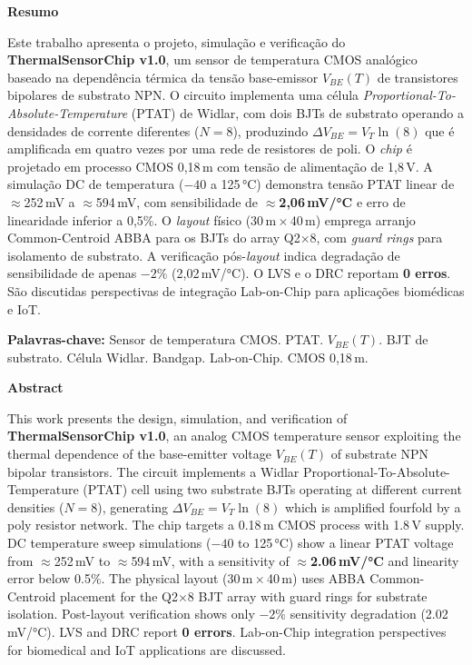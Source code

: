 \documentclass[12pt,a4paper]{article}
\newenvironment{resumoenv}{%
  \begin{center}\textbf{Resumo}\end{center}\small\setlength{\parindent}{0pt}}{}
\newenvironment{abstractenv}{%
  \begin{center}\textbf{Abstract}\end{center}\small\setlength{\parindent}{0pt}}{}
\begin{document}
\thispagestyle{empty}
\begin{resumoenv}
Este trabalho apresenta o projeto, simulação e verificação do \textbf{ThermalSensorChip v1.0},
um sensor de temperatura CMOS analógico baseado na dependência térmica da tensão base-emissor
$V_{BE}(T)$ de transistores bipolares de substrato NPN. O circuito implementa uma célula
\textit{Proportional-To-Absolute-Temperature} (PTAT) de Widlar, com dois BJTs de substrato
operando a densidades de corrente diferentes ($N=8$), produzindo $\Delta V_{BE} = V_T \ln(8)$
que é amplificada em quatro vezes por uma rede de resistores de poli. O \textit{chip} é projetado
em processo CMOS 0,18\,\textmu m com tensão de alimentação de 1,8\,V. A simulação DC de
temperatura ($-40$ a 125\,°C) demonstra tensão PTAT linear de $\approx$252\,mV a $\approx$594\,mV,
com sensibilidade de \textbf{$\approx$2,06\,mV/°C} e erro de linearidade inferior a 0,5\%.
O \textit{layout} físico (30\,\textmu m\,$\times$\,40\,\textmu m) emprega arranjo
Common-Centroid ABBA para os BJTs do array Q2$\times$8, com \textit{guard rings} para
isolamento de substrato. A verificação pós-\textit{layout} indica degradação de sensibilidade
de apenas $-2\%$ (2,02\,mV/°C). O LVS e o DRC reportam \textbf{0 erros}. São discutidas
perspectivas de integração Lab-on-Chip para aplicações biomédicas e IoT.
\end{resumoenv}

\vspace{0.8cm}
\noindent\textbf{Palavras-chave:} Sensor de temperatura CMOS. PTAT. $V_{BE}(T)$. BJT de substrato.
Célula Widlar. Bandgap. Lab-on-Chip. CMOS 0,18\,\textmu m.

\vspace{1.0cm}
\begin{abstractenv}
This work presents the design, simulation, and verification of \textbf{ThermalSensorChip v1.0},
an analog CMOS temperature sensor exploiting the thermal dependence of the base-emitter voltage
$V_{BE}(T)$ of substrate NPN bipolar transistors. The circuit implements a Widlar
Proportional-To-Absolute-Temperature (PTAT) cell using two substrate BJTs operating at different
current densities ($N=8$), generating $\Delta V_{BE} = V_T \ln(8)$ which is amplified fourfold by
a poly resistor network. The chip targets a 0.18\,\textmu m CMOS process with 1.8\,V supply. DC
temperature sweep simulations ($-40$ to 125\,°C) show a linear PTAT voltage from $\approx$252\,mV
to $\approx$594\,mV, with a sensitivity of \textbf{$\approx$2.06\,mV/°C} and linearity error below
0.5\%. The physical layout (30\,\textmu m\,$\times$\,40\,\textmu m) uses ABBA Common-Centroid
placement for the Q2$\times$8 BJT array with guard rings for substrate isolation. Post-layout
verification shows only $-2\%$ sensitivity degradation (2.02\,mV/°C). LVS and DRC report
\textbf{0 errors}. Lab-on-Chip integration perspectives for biomedical and IoT applications are
discussed.
\end{abstractenv}
\end{document}
